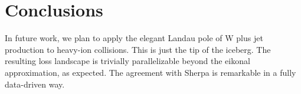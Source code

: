 \section{Conclusions}\label{sec:conclusions}

In future work, we plan to apply the elegant Landau pole of W plus jet
production to heavy-ion collisions. This is just the tip of the iceberg.
The resulting loss landscape is trivially parallelizable beyond the
eikonal approximation, as expected. The agreement with Sherpa is
remarkable in a fully data-driven way.


